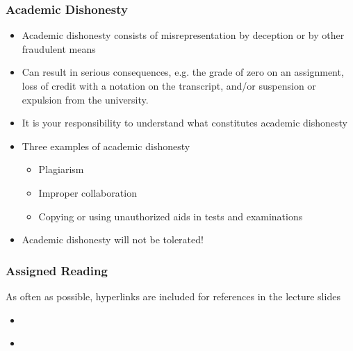 \documentclass[t,12pt,numbers,fleqn]{beamer}
\begin{document}
\begin{frame}
\frametitle{Academic Dishonesty}

\begin {itemize}

\item Academic dishonesty consists of misrepresentation by deception or by other fraudulent means
\item Can result in serious consequences, e.g. the grade of zero on an assignment, loss of credit with a notation on
the transcript, and/or suspension or expulsion from the university.
\item It is your responsibility to understand what constitutes academic dishonesty
\item Three examples of academic dishonesty
\begin{itemize}
\item Plagiarism
\item Improper collaboration
\item Copying or using unauthorized aids in tests and examinations
\end{itemize}
\item Academic dishonesty will not be tolerated!
\end{itemize}

\end{frame}


\begin{frame}
\frametitle{Assigned Reading}

As often as possible, hyperlinks are included for references in the lecture
slides

\begin {itemize}

\item
  \href{https://gitlab.cas.mcmaster.ca/smiths/cas741/blob/master/ReferenceMaterial/SoftEngForScienceBook.pdf}
  {}
\item
  \href{https://gitlab.cas.mcmaster.ca/smiths/cas741/blob/master/ReferenceMaterial/SmithLaiAndKhedri2007fulltext.pdf}
  {}
\end{itemize}

\end{frame}

\end{document}
